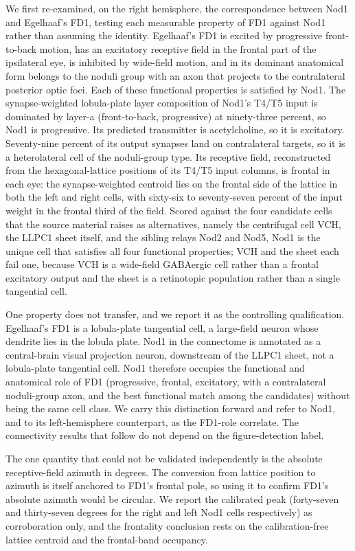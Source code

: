 \documentclass[11pt]{article}
\begin{document}
We first re-examined, on the right hemisphere, the correspondence between Nod1 and Egelhaaf's
FD1, testing each measurable property of FD1 against Nod1 rather than assuming the identity.
Egelhaaf's FD1 is excited by progressive front-to-back motion, has an excitatory receptive field
in the frontal part of the ipsilateral eye, is inhibited by wide-field motion, and in its
dominant anatomical form belongs to the noduli group with an axon that projects to the
contralateral posterior optic foci. Each of these functional properties is satisfied by Nod1. The
synapse-weighted lobula-plate layer composition of Nod1's T4/T5 input is dominated by layer-a
(front-to-back, progressive) at ninety-three percent, so Nod1 is progressive. Its predicted
transmitter is acetylcholine, so it is excitatory. Seventy-nine percent of its output synapses
land on contralateral targets, so it is a heterolateral cell of the noduli-group type. Its
receptive field, reconstructed from the hexagonal-lattice positions of its T4/T5 input columns,
is frontal in each eye: the synapse-weighted centroid lies on the frontal side of the lattice in
both the left and right cells, with sixty-six to seventy-seven percent of the input weight in the
frontal third of the field. Scored against the four candidate cells that the source material
raises as alternatives, namely the centrifugal cell VCH, the LLPC1 sheet itself, and the sibling
relays Nod2 and Nod5, Nod1 is the unique cell that satisfies all four functional properties; VCH
and the sheet each fail one, because VCH is a wide-field GABAergic cell rather than a frontal
excitatory output and the sheet is a retinotopic population rather than a single tangential cell.

One property does not transfer, and we report it as the controlling qualification. Egelhaaf's FD1
is a lobula-plate tangential cell, a large-field neuron whose dendrite lies in the lobula plate.
Nod1 in the connectome is annotated as a central-brain visual projection neuron, downstream of
the LLPC1 sheet, not a lobula-plate tangential cell. Nod1 therefore occupies the functional and
anatomical role of FD1 (progressive, frontal, excitatory, with a contralateral noduli-group axon,
and the best functional match among the candidates) without being the same cell class. We carry
this distinction forward and refer to Nod1, and to its left-hemisphere counterpart, as the
FD1-role correlate. The connectivity results that follow do not depend on the figure-detection
label.

The one quantity that could not be validated independently is the absolute receptive-field
azimuth in degrees. The conversion from lattice position to azimuth is itself anchored to FD1's
frontal pole, so using it to confirm FD1's absolute azimuth would be circular. We report the
calibrated peak (forty-seven and thirty-seven degrees for the right and left Nod1 cells
respectively) as corroboration only, and the frontality conclusion rests on the calibration-free
lattice centroid and the frontal-band occupancy.
\end{document}
